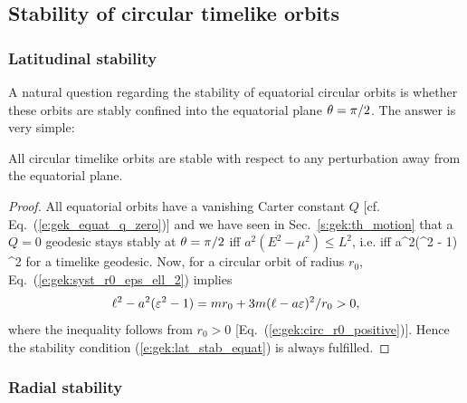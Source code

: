 \subsection{Stability of circular timelike orbits}

\subsubsection{Latitudinal stability}

A natural question regarding the stability of equatorial circular orbits
is whether these orbits are stably confined into the equatorial plane
$\theta=\pi/2$. The answer is very simple:
\begin{greybox}
All circular timelike orbits are stable with respect to any perturbation
away from the equatorial plane.
\end{greybox}
\begin{proof}
All equatorial orbits have a vanishing Carter constant $Q$
[cf. Eq.~(\ref{e:gek_equat_q_zero})] and we
have seen in Sec.~\ref{s:gek:th_motion} that a $Q=0$ geodesic stays stably at
$\theta=\pi/2$ iff $a^2(E^2 - \mu^2) \leq L^2$, i.e. iff
\be \label{e:gek:lat_stab_equat}
    a^2(\veps^2 - 1) \leq \ell^2
\ee
for a timelike geodesic.
Now, for a circular orbit of radius $r_0$,
Eq.~(\ref{e:gek:syst_r0_eps_ell_2}) implies
\[
   \ell^2 - a^2 (\varepsilon^2 - 1) = m r_0 + 3 m (\ell - a \varepsilon)^2 / r_0 > 0 ,
\]
where the inequality follows from
$r_0 > 0$ [Eq.~(\ref{e:gek:circ_r0_positive})].
Hence the stability condition (\ref{e:gek:lat_stab_equat}) is always fulfilled.
\end{proof}


\subsubsection{Radial stability}

